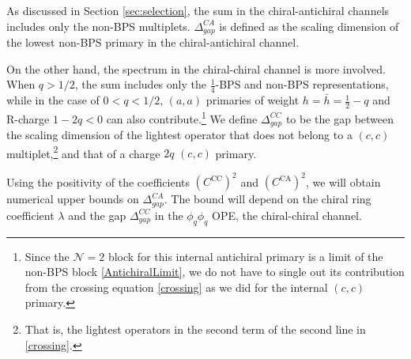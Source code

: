 \documentclass[12pt]{article}
\begin{document}
As discussed in Section \ref{sec:selection}, the sum in the chiral-antichiral channels includes only the non-BPS multiplets.  $\Delta^{CA}_{gap}$ is defined as the scaling dimension of the lowest non-BPS primary  in the chiral-antichiral channel.  

On the other hand, the spectrum in the chiral-chiral channel is more involved.  When $q>1/2$, the sum includes only the $\frac14$-BPS and non-BPS representations, while in the case of $0<q<1/2$,  $(a,a)$ primaries of weight $h=\bar h= \frac12 -q$ and R-charge $1-2q<0$ can also contribute.\footnote{Since the $\mathcal{N}=2$ block for this internal antichiral primary is a limit of the non-BPS block \eqref{AntichiralLimit}, we do not have to single out its contribution from the crossing equation \eqref{crossing} as we did for the internal $(c,c)$ primary.}    We define $\Delta^{CC}_{gap}$ to be the gap between the scaling dimension of the lightest operator that does not belong to a $(c,c)$ multiplet,\footnote{That is, the lightest operators in the second term of the second line in  \eqref{crossing}.} and that of a charge $2q$ $(c,c)$ primary.  




Using the positivity of the coefficients $(C^\text{CC})^2$ and $(C^\text{CA})^2$, we will obtain numerical upper bounds on  $\Delta^{CA}_{gap}$.  The bound will depend on the chiral ring coefficient $\lambda$ and the gap $\Delta^{CC}_{gap}$ in the $\phi_q\phi_q$ OPE, the chiral-chiral channel. 
\end{document}
